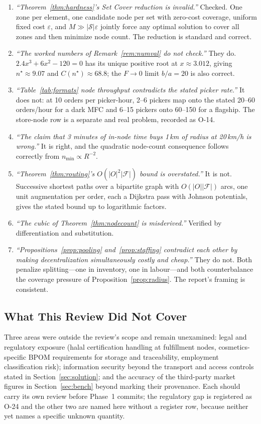 \begin{enumerate}
\item \emph{``Theorem~\ref{thm:hardness}'s Set Cover reduction is invalid.''} Checked. One zone per element, one candidate node per set with zero-cost coverage, uniform fixed cost $\varepsilon$, and $M\gg|\mathcal{S}|\varepsilon$ jointly force any optimal solution to cover all zones and then minimize node count. The reduction is standard and correct.
\item \emph{``The worked numbers of Remark~\ref{rem:numval} do not check.''} They do. $2.4x^3+6x^2-120=0$ has its unique positive root at $x\approx3.012$, giving $n^\star\approx9.07$ and $C(n^\star)\approx68.8$; the $F\to0$ limit $b/a=20$ is also correct.
\item \emph{``Table~\ref{tab:formats} node throughput contradicts the stated picker rate.''} It does not: at 10 orders per picker-hour, 2--6 pickers map onto the stated 20--60 orders/hour for a dark MFC and 6--15 pickers onto 60--150 for a flagship. The store-node row is a separate and real problem, recorded as O-14.
\item \emph{``The claim that 3 minutes of in-node time buys 1\,km of radius at 20\,km/h is wrong.''} It is right, and the quadratic node-count consequence follows correctly from $n_{\min}\propto R^{-2}$.
\item \emph{``Theorem~\ref{thm:routing}'s $O(|O|^2|\mathcal{F}|)$ bound is overstated.''} It is not. Successive shortest paths over a bipartite graph with $O(|O||\mathcal{F}|)$ arcs, one unit augmentation per order, each a Dijkstra pass with Johnson potentials, gives the stated bound up to logarithmic factors.
\item \emph{``The cubic of Theorem~\ref{thm:nodecount} is misderived.''} Verified by differentiation and substitution.
\item \emph{``Propositions~\ref{prop:pooling} and~\ref{prop:staffing} contradict each other by making decentralization simultaneously costly and cheap.''} They do not. Both penalize splitting---one in inventory, one in labour---and both counterbalance the coverage pressure of Proposition~\ref{prop:radius}. The report's framing is consistent.
\end{enumerate}

\subsection{What This Review Did Not Cover}

Three areas were outside the review's scope and remain unexamined: legal and regulatory exposure (halal certification handling at fulfillment nodes, cosmetics-specific BPOM requirements for storage and traceability, employment classification risk); information security beyond the transport and access controls stated in Section~\ref{sec:solution}; and the accuracy of the third-party market figures in Section~\ref{sec:bench} beyond marking their provenance. Each should carry its own review before Phase~1 commits; the regulatory gap is registered as O-24 and the other two are named here without a register row, because neither yet names a specific unknown quantity.
